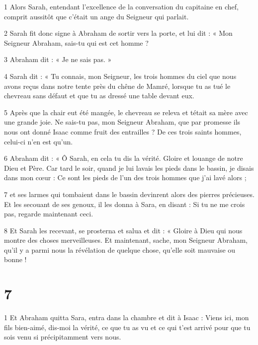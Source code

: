 \par 1 Alors Sarah, entendant l'excellence de la conversation du capitaine en chef, comprit aussitôt que c'était un ange du Seigneur qui parlait.

\par 2 Sarah fit donc signe à Abraham de sortir vers la porte, et lui dit : « Mon Seigneur Abraham, sais-tu qui est cet homme ?

\par 3 Abraham dit : « Je ne sais pas. »

\par 4 Sarah dit : « Tu connais, mon Seigneur, les trois hommes du ciel que nous avons reçus dans notre tente près du chêne de Mamré, lorsque tu as tué le chevreau sans défaut et que tu as dressé une table devant eux.

\par 5 Après que la chair eut été mangée, le chevreau se releva et tétait sa mère avec une grande joie. Ne sais-tu pas, mon Seigneur Abraham, que par promesse ils nous ont donné Isaac comme fruit des entrailles ? De ces trois saints hommes, celui-ci n’en est qu’un.

\par 6 Abraham dit : « Ô Sarah, en cela tu dis la vérité. Gloire et louange de notre Dieu et Père. Car tard le soir, quand je lui lavais les pieds dans le bassin, je disais dans mon cœur : Ce sont les pieds de l'un des trois hommes que j'ai lavé alors ;

\par 7 et ses larmes qui tombaient dans le bassin devinrent alors des pierres précieuses. Et les secouant de ses genoux, il les donna à Sara, en disant : Si tu ne me crois pas, regarde maintenant ceci.

\par 8 Et Sarah les recevant, se prosterna et salua et dit : « Gloire à Dieu qui nous montre des choses merveilleuses. Et maintenant, sache, mon Seigneur Abraham, qu'il y a parmi nous la révélation de quelque chose, qu'elle soit mauvaise ou bonne !


\chapter{7}

\par 1 Et Abraham quitta Sara, entra dans la chambre et dit à Isaac : Viens ici, mon fils bien-aimé, dis-moi la vérité, ce que tu as vu et ce qui t'est arrivé pour que tu sois venu si précipitamment vers nous.

